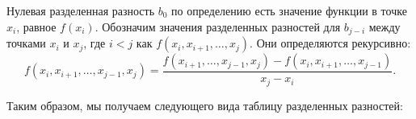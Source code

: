 		Нулевая разделенная разность $b_0$ по определению есть значение функции в точке $x_i$, равное $f(x_i)$. Обозначим значения разделенных разностей для $b_{j-i}$ между точками $x_i$ и $x_j$, где $i < j$ как $f(x_i, x_{i+1}, \ldots, x_j)$. Они определяются рекурсивно:
		\begin{equation*}
			f(x_i, x_{i+1}, \ldots, x_{j-1}, x_j) = \frac{f(x_{i+1}, \ldots, x_{j-1}, x_{j}) - f(x_i, x_{i+1}, \ldots, x_{j - 1})}{x_j - x_i}.
		\end{equation*}
	
		Таким образом, мы получаем следующего вида таблицу разделенных разностей:

		\begin{table}[h!]
			\centering
\end{table}
